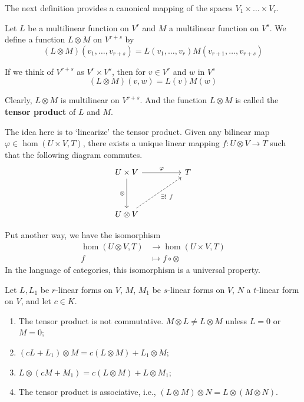 The next definition provides a canonical mapping of the spaces $V_1 \times \ldots \times V_r$.

\begin{definition}
	Let $L$ be a multilinear function on $V^r$ and $M$ a multilinear function on $V^s$. We define a function $L \otimes M$ on $V^{r+s}$ by
	\[
		(L \otimes M)(v_1, \ldots, v_{r+s}) = L(v_1, \ldots, v_r) M (v_{r+1}, \ldots, v_{r+s})
	\]
	
	If we think of $V^{r+s}$ as $V^r \times V^s$, then for $v \in V^r$ and $w$ in $V^s$
	\[
		(L \otimes M)(v, w) = L(v)M(w)
	\]
	
	Clearly, $L \otimes M$ is multilinear on $V^{r+s}$. And the function $L \otimes M$ is called the \textbf{tensor product} of $L$ and $M$.
\end{definition}

The idea here is to `linearize' the tensor product. Given any bilinear map $\varphi \in \hom(U \times V, T)$, there exists a unique linear mapping $f : U \otimes V \longrightarrow T$ such that the following diagram commutes.
\[\begin{tikzcd}
	{U \times V} && T \\
	\\
	{U \otimes V}
	\arrow["\varphi", from=1-1, to=1-3]
	\arrow["\otimes"', from=1-1, to=3-1]
	\arrow["{\exists! ~f}"', dashed, from=3-1, to=1-3]
\end{tikzcd}\]

Put another way, we have the isomorphism
\begin{equation*}
	\begin{aligned}
		\hom(U \otimes V, T) &\longrightarrow \hom(U \times V, T) \\
		f &\longmapsto f \circ \otimes
	\end{aligned}
\end{equation*}
In the language of categories, this isomorphism is a universal property.

\begin{lemma}
	Let $L, L_1$ be $r$-linear forms on $V$, $M$, $M_1$ be $s$-linear forms on $V$, $N$ a $t$-linear form on $V$, and let $c \in K$.
	
	\begin{enumerate}
		\item The tensor product is not commutative. $M \otimes L \neq L \otimes M$ unless $L = 0$ or $M = 0$;
		\item $(cL+L_1) \otimes M = c(L \otimes M) + L_1 \otimes M$;
		\item $L \otimes (cM + M_1) = c(L \otimes M) + L \otimes M_1$;
		\item The tensor product is associative, i.e., $(L \otimes M) \otimes N = L \otimes (M \otimes N)$.
	\end{enumerate}
\end{lemma}

